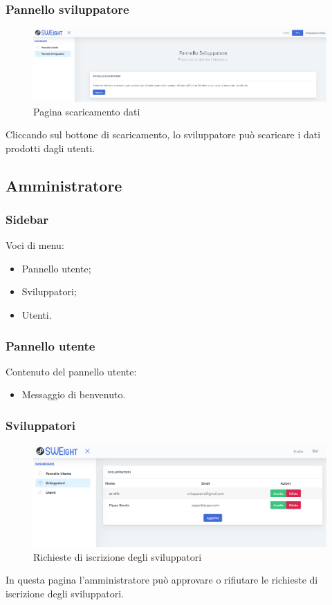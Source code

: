    	\subsubsection{Pannello sviluppatore}
    		\begin{figure}[H]
			\centering
			\includegraphics[width=17cm]{sez/img/sviluppatore/datipronti.PNG}
			\caption{Pagina scaricamento dati}\label{fig:1}
			\end{figure}
		  Cliccando sul bottone di scaricamento, lo sviluppatore può scaricare i dati prodotti dagli utenti.




	\newpage
	\subsection{Amministratore}
		\subsubsection{Sidebar}
		  Voci di menu:
			\begin{itemize}
			\item Pannello utente;
			\item Sviluppatori;
			\item Utenti.
			\end{itemize}



		\subsubsection{Pannello utente}
		 Contenuto del pannello utente:
			\begin{itemize}
			\item Messaggio di benvenuto.
			\end{itemize}




		\subsubsection{Sviluppatori}
			\begin{figure}[H]
			\centering
			\includegraphics[width=17cm]{sez/img/amministratore/conf_ric_svil.PNG}
			\caption{Richieste di iscrizione degli sviluppatori}\label{fig:1}
			\end{figure}
		  In questa pagina l'amministratore può approvare o rifiutare le richieste di iscrizione degli sviluppatori.


